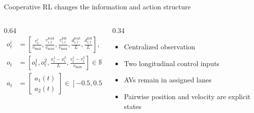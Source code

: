 \documentclass[aspectratio=169,11pt]{beamer}
\begin{document}
\begin{frame}[shrink=8]{Cooperative RL changes the information and action structure}
  \begin{columns}[T,onlytextwidth]
    \begin{column}{0.64\textwidth}
      \scriptsize
      \begin{align*}
        o_t^i&=\left[
          \frac{v_t^i}{v_{\max}},
          \frac{v_{i,t}^{\mathrm{lead}}}{v_{\max}},
          \frac{v_{i,t}^{\mathrm{foll}}}{v_{\max}},
          \frac{d_{i,t}^{\mathrm{lead}}}{L},
          \frac{d_{i,t}^{\mathrm{foll}}}{L}
        \right],\\[0.18cm]
        o_t&=\left[o_t^1,o_t^2,
          \frac{x_t^1-x_t^2}{L},
          \frac{v_t^1-v_t^2}{v_{\max}}
        \right]\in\mathbb{R}^{12},\\[0.18cm]
        a_t&=\begin{bmatrix}a_1(t)\\a_2(t)\end{bmatrix}\in[-0.5,0.5]^2.
      \end{align*}
    \end{column}
    \begin{column}{0.34\textwidth}
      \begin{itemize}\setlength\itemsep{0.24cm}
        \item Centralized observation
        \item Two longitudinal control inputs
        \item AVs remain in assigned lanes
        \item Pairwise position and velocity are explicit states
      \end{itemize}
      \centering
    \end{column}
  \end{columns}
\end{frame}
\end{document}

